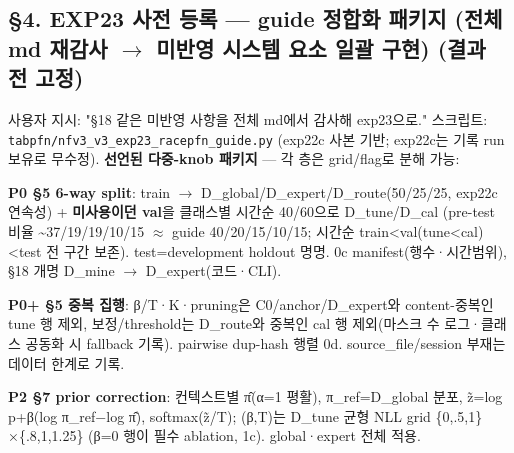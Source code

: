 \subsection{§4. EXP23 사전 등록 — guide 정합화 패키지 (전체 md 재감사  \ensuremath{\rightarrow}  미반영 시스템 요소 일괄 구현) (결과 전 고정)}
사용자 지시: "§18 같은 미반영 사항을 전체 md에서 감사해 exp23으로." 스크립트: \texttt{tabpfn/\allowbreak{}\allowbreak{}n\allowbreak{}fv3\_\allowbreak{}\allowbreak{}v3\_\allowbreak{}\allowbreak{}e\allowbreak{}xp23\_\allowbreak{}\allowbreak{}rac\allowbreak{}epfn\_\allowbreak{}\allowbreak{}gui\allowbreak{}de.\allowbreak{}py} (exp22c 사본 기반; exp22c는 기록 run 보유로 무수정). \textbf{선언된 다중-knob 패키지} — 각 층은 grid/\allowbreak{}flag로 분해 가능:

\par\noindent \textbullet\enspace \textbf{P0 §5 6-way split}: train \ensuremath{\rightarrow} D\_\allowbreak{}global/\allowbreak{}D\_\allowbreak{}expert/\allowbreak{}D\_\allowbreak{}route(50/\allowbreak{}25/\allowbreak{}25, exp22c 연속성) +\allowbreak{} \textbf{미사용이던 val}을 클래스별 시간순 40/\allowbreak{}60으로 D\_\allowbreak{}tune/\allowbreak{}D\_\allowbreak{}cal (pre-test 비율 \textasciitilde{}37/\allowbreak{}19/\allowbreak{}19/\allowbreak{}10/\allowbreak{}15 \ensuremath{\approx} guide 40/\allowbreak{}20/\allowbreak{}15/\allowbreak{}10/\allowbreak{}15; 시간순 train<val(tune<cal)<test 전 구간 보존). test=\allowbreak{}development holdout 명명. 0c manifest(행수·시간범위), §18 개명 D\_\allowbreak{}mine \ensuremath{\rightarrow} D\_\allowbreak{}expert(코드·CLI).


\par\noindent \textbullet\enspace \textbf{P0+\allowbreak{} §5 중복 집행}: β/\allowbreak{}T·K·pruning은 C0/\allowbreak{}anchor/\allowbreak{}D\_\allowbreak{}expert와 content-중복인 tune 행 제외, 보정/\allowbreak{}threshold는 D\_\allowbreak{}route와 중복인 cal 행 제외(마스크 수 로그·클래스 공동화 시 fallback 기록). pairwise dup-hash 행렬 0d. source\_\allowbreak{}file/\allowbreak{}session 부재는 데이터 한계로 기록.


\par\noindent \textbullet\enspace \textbf{P2 §7 prior correction}: 컨텍스트별 π̂(α=\allowbreak{}1 평활), π\_\allowbreak{}ref=\allowbreak{}D\_\allowbreak{}global 분포, z̃=\allowbreak{}log p+\allowbreak{}β(log π\_\allowbreak{}ref−log π̂), softmax(z̃/\allowbreak{}T); (β,T)는 D\_\allowbreak{}tune 균형 NLL grid \{0,.5,1\}×\{.8,1,1.25\} (β=\allowbreak{}0 행이 필수 ablation, 1c). global·expert 전체 적용.


